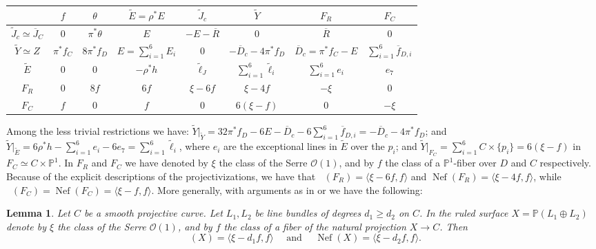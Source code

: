 \documentclass[12pt]{amsart}
\newtheorem{lemma}{Lemma}[section]
\theoremstyle{definition}
\newcommand{\bb}{\ensuremath{\mathfrak{b}}}
\renewcommand{\geq}{\geqslant}
\DeclareMathOperator{\Nef}{Nef}
\DeclareMathOperator{\Eff}{\overline{Eff}}
\newcommand{\?}{ \circled{{\large\bf ?}}}
\let\cal\mathcal
\let\bb\mathbb
\begin{document}
\begin{center}
	\begin{tabular}{|c|c|c|c|c|c|c|c|}
		\hline 
		& $f$& $\theta$& $\widetilde E=\rho^*E$& $\widetilde J_c$ & $\widetilde Y$& $F_R$& $F_C$\\
		\hline\hline 
		$\widetilde J_c\simeq\overline J_C$ & $0$ & $\pi^*\theta$  & $E$& $-E-\overline R$ & $0$ & $\overline R$ & $0$ \\
		\hline 
		$\widetilde Y\simeq Z$ & $\pi^*f_C$ & $8\pi^*f_D$ & $E=\sum_{i=1}^6E_i$& $0$ & $-\overline D_c-4\pi^*f_D$ & $\overline D_c=\pi^*f_C-E$ & $\sum_{i=1}^6\overline f_{D,i}$ \\
		\hline 
		$\widetilde E$ & $0$ & $0$ & $-\rho^*h$& $\widetilde{\ell}_J$ & $\sum_{i=1}^6\widetilde\ell_i$ & $\sum_{i=1}^6e_i$ & $e_7$ \\
		\hline 
		$F_R$ & $0$  & $8f$ & $6f$& $\xi-6f$ & $\xi-4f$ & $-\xi$ & $0$ \\ 
		\hline 
		$F_C$ & $f$ & $0$ & $f$& $0$ & $6(\xi-f)$ & $0$ & $-\xi$ 	\\
		\hline 	 
	\end{tabular}
\end{center}
Among the less trivial restrictions we have:
$\widetilde Y|_{\widetilde Y}=32\pi^*f_D-6E-\overline D_c-6\sum_{i=1}^6\overline f_{D,i}=-\overline D_c-4\pi^*f_D$; and $\widetilde Y|_{\widetilde E}=6\rho^*h-\sum_{i=1}^6e_i-6e_7=\sum_{i=1}^6\widetilde\ell_i$, where $e_i$ are the exceptional lines in $\widetilde E$ over the $p_i$; and $\widetilde Y|_{F_C}=\sum_{i=1}^6C\times\{p_i\}=6(\xi-f)$ in $F_C\simeq C\times\bb P^1$. In $F_R$ and $F_C$ we have denoted by $\xi$ the class of the Serre $\cal O(1)$, and by $f$ the class of a $\bb P^1$-fiber over $D$ and $C$ respectively. Because of the explicit descriptions of the projectivizations, we have that $\Eff(F_R)=\langle\xi-6f,f\rangle$ and $\Nef(F_R)=\langle\xi-4f,f\rangle$, while $\Eff(F_C)=\Nef(F_C)=\langle\xi-f,f\rangle$. More generally, with arguments as in \cite[Ch.V.\S2]{H77} or \cite{Ful11} we have the following:
\begin{lemma}
	Let $C$ be a smooth projective curve. Let $L_1,L_2$ be line bundles of degrees $d_1\geq d_2$ on $C$. In the ruled surface $X=\bb P(L_1\oplus L_2)$ denote by $\xi$ the class of the Serre $\cal O(1)$, and by $f$ the class of a fiber of the natural projection $X\to C$. Then
	\[\Eff(X)=\langle\xi-d_1f,f\rangle\quad\text{ and }\quad\Nef(X)=\langle \xi-d_2f,f\rangle.\]
\end{lemma}
\end{document}
